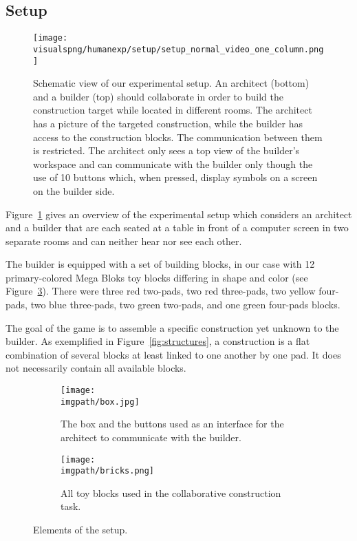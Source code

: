 \subsection{Setup}

\begin{figure}[!htbp]
\centering
\texttt{[image: \\visualspng/humanexp/setup/setup\_normal\_video\_one\_column.png]}
\caption{Schematic view of our experimental setup. An architect (bottom) and a builder (top) should collaborate in order to build the construction target while located in different rooms. The architect has a picture of the targeted construction, while the builder has access to the construction blocks. The communication between them is restricted. The architect only sees a top view of the builder's workspace and can communicate with the builder only though the use of 10 buttons which, when pressed, display symbols on a screen on the builder side.}
\label{fig:overviewsetup}
\end{figure}

Figure~\ref{fig:overviewsetup} gives an overview of the experimental setup which considers an architect and a builder that are each seated at a table in front of a computer screen in two separate rooms and can neither hear nor see each other. 

The builder is equipped with a set of building blocks, in our case with 12 primary-colored Mega Bloks\textsuperscript{\textregistered} toy blocks differing in shape and color (see Figure~\ref{fig:bricks}). There were three red two-pads, two red three-pads, two yellow four-pads, two blue three-pads, two green two-pads, and one green four-pads blocks. 

The goal of the game is to assemble a specific construction yet unknown to the builder. As exemplified in Figure~\ref{fig:structures}, a construction is a flat combination of several blocks at least linked to one another by one pad. It does not necessarily contain all available blocks.

\begin{figure}[!htbp]
\centering
\begin{subfigure}[b]{0.49\columnwidth}
          \centering
          \texttt{[image: \\imgpath/box.jpg]}
          \caption{The box and the buttons used as an interface for the architect to communicate with the builder.}
          \label{fig:box}
\end{subfigure}
\begin{subfigure}[b]{0.49\columnwidth}
          \centering
          \texttt{[image: \\imgpath/bricks.png]}
          \caption{All toy blocks used in the collaborative construction task.}
          \label{fig:bricks}
\end{subfigure}
\caption{Elements of the setup.}
\label{fig:stuff}
\end{figure}

